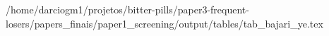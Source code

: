 /home/darciogm1/projetos/bitter-pills/paper3-frequent-losers/papers_finais/paper1_screening/output/tables/tab_bajari_ye.tex